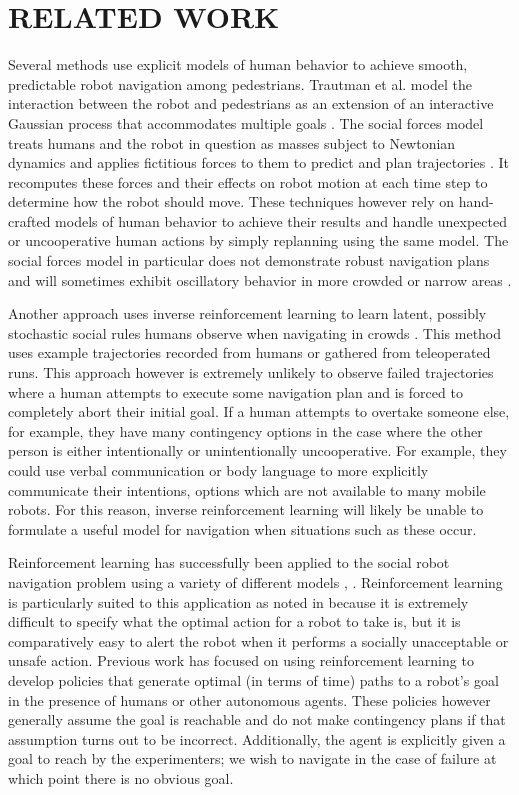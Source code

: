 \documentclass[letterpaper, 10 pt, conference]{ieeeconf}  %
\begin{document}
\section{RELATED WORK}\label{sec:relatedwork}
	Several methods use explicit models of human behavior to achieve smooth, predictable robot navigation among pedestrians. Trautman et al. model the interaction between the robot and pedestrians as an extension of an interactive Gaussian process that accommodates multiple goals \cite{caseforcoop}. The social forces model treats humans and the robot in question as masses subject to Newtonian dynamics and applies fictitious forces to them to predict and plan trajectories \cite{sfm}. It recomputes these forces and their effects on robot motion at each time step to determine how the robot should move. These techniques however rely on hand-crafted models of human behavior to achieve their results and handle unexpected or uncooperative human actions by simply replanning using the same model. The social forces model in particular does not demonstrate robust navigation plans and will sometimes exhibit oscillatory behavior in more crowded or narrow areas \cite{sfm}.
	
	Another approach uses inverse reinforcement learning to learn latent, possibly stochastic social rules humans observe when navigating in crowds \cite{socialirl}. This method uses example trajectories recorded from humans or gathered from teleoperated runs. This approach however is extremely unlikely to observe failed trajectories where a human attempts to execute some navigation plan and is forced to completely abort their initial goal. If a human attempts to overtake someone else, for example, they have many contingency options in the case where the other person is either intentionally or unintentionally uncooperative. For example, they could use verbal communication or body language to more explicitly communicate their intentions, options which are not available to many mobile robots. For this reason, inverse reinforcement learning will likely be unable to formulate a useful model for navigation when situations such as these occur.
	
	Reinforcement learning has successfully been applied to the social robot navigation problem using a variety of different models \cite{sociallyawarerl}, \cite{crowdawarerl}. Reinforcement learning is particularly suited to this application as noted in \cite{sociallyawarerl} because it is extremely difficult to specify what the optimal action for a robot to take is, but it is comparatively easy to alert the robot when it performs a socially unacceptable or unsafe action. Previous work has focused on using reinforcement learning to develop policies that generate optimal (in terms of time) paths to a robot's goal in the presence of humans or other autonomous agents. These policies however generally assume the goal is reachable and do not make contingency plans if that assumption turns out to be incorrect. Additionally, the agent is explicitly given a goal to reach by the experimenters; we wish to navigate in the case of failure at which point there is no obvious goal.
	
\end{document}
